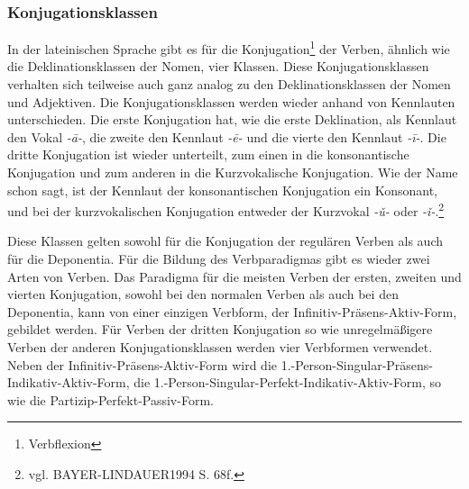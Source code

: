 \documentclass[12pt,abstract=on]{scrreprt}
\begin{document}
\subsubsection{Konjugationsklassen}
In der lateinischen Sprache gibt es für die Konjugation\footnote{Verbflexion} der Verben, ähnlich wie die Deklinationsklassen der Nomen, vier Klassen. Diese Konjugationsklassen verhalten sich teilweise auch ganz analog zu den Deklinationsklassen der Nomen und Adjektiven. Die Konjugationsklassen werden wieder anhand von Kennlauten unterschieden. Die erste Konjugation hat, wie die erste Deklination, als Kennlaut den Vokal \textit{-ā-}, die zweite den Kennlaut \textit{-ē-} und die vierte den Kennlaut \textit{-ī-}. Die dritte Konjugation ist wieder unterteilt, zum einen in die konsonantische Konjugation und zum anderen in die Kurzvokalische Konjugation. Wie der Name schon sagt, ist der Kennlaut der konsonantischen Konjugation ein Konsonant, und bei der kurzvokalischen Konjugation entweder der Kurzvokal \textit{-ǔ-} oder \textit{-ǐ-}.\footnote{vgl. BAYER-LINDAUER1994 S. 68f.} \par
Diese Klassen gelten sowohl für die Konjugation der regulären Verben als auch für die Deponentia. Für die Bildung des Verbparadigmas gibt es wieder zwei Arten von Verben. Das Paradigma für die meisten Verben der ersten, zweiten und vierten Konjugation, sowohl bei den normalen Verben als auch bei den Deponentia, kann von einer einzigen Verbform, der Infinitiv-Präsens-Aktiv-Form, gebildet werden. Für Verben der dritten Konjugation so wie unregelmäßigere Verben der anderen Konjugationsklassen werden vier Verbformen verwendet. Neben der Infinitiv-Präsens-Aktiv-Form wird die 1.-Person-Singular-Präsens-Indikativ-Aktiv-Form, die 1.-Person-Singular-Perfekt-Indikativ-Aktiv-Form, so wie die Partizip-Perfekt-Passiv-Form.  \par
\end{document}
